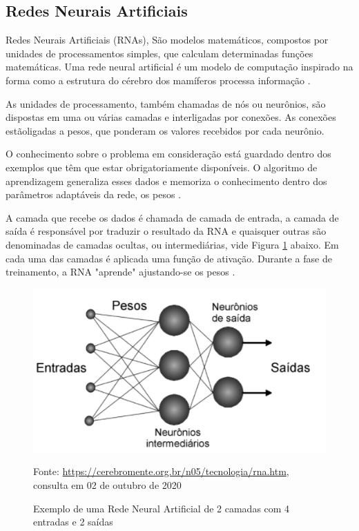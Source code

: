 \documentclass[12pt]{article}
\begin{document}
\subsection{Redes Neurais Artificiais}

Redes Neurais Artificiais (RNAs), São modelos matemáticos, compostos por 
unidades de processamentos simples, que calculam determinadas funções 
matemáticas. Uma rede neural artificial é um modelo de computação inspirado na 
forma como a estrutura do cérebro dos mamíferos processa informação 
\cite{de2003tecnicas}.

As unidades de processamento, também chamadas de nós ou neurônios, são
dispostas em uma ou várias camadas e interligadas por conexões. 
As conexões estãoligadas a pesos, que ponderam os valores recebidos por cada 
neurônio.

O conhecimento sobre o problema em consideração está guardado dentro dos
exemplos que têm que estar obrigatoriamente disponíveis. O algoritmo de
aprendizagem generaliza esses dados e memoriza o conhecimento dentro dos
parâmetros adaptáveis da rede, os pesos \cite{rauber2005redes}.

A camada que recebe os dados é chamada de camada de entrada, a camada de saída
é responsável por traduzir o resultado da RNA e quaisquer outras são denominadas 
de camadas ocultas, ou intermediárias, vide Figura \ref{fig:nnet} abaixo. 
Em cada uma das camadas é aplicada uma função de ativação. Durante a fase de 
treinamento, a RNA "aprende" ajustando-se os pesos \cite{bishop1996neural}.

\begin{figure}[ht]
  \centering
  \includegraphics[scale=0.6]{img/nnet.png}
  \caption{Exemplo de uma Rede Neural Artificial de 2 camadas com 4 
  entradas e 2 saídas}
  Fonte: \url{https://cerebromente.org.br/n05/tecnologia/rna.htm}, 
  \\consulta em 02 de outubro de 2020
  \label{fig:nnet}
\end{figure}
\end{document}
